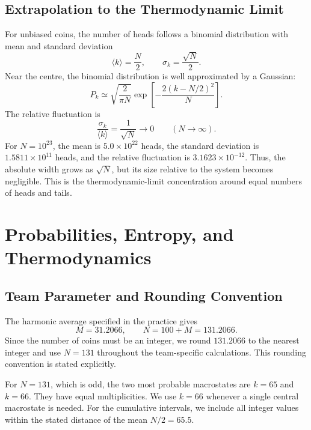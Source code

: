 \documentclass[10pt,a4paper]{article}
\begin{document}
\subsection{Extrapolation to the Thermodynamic Limit}
For unbiased coins, the number of heads follows a binomial distribution with mean and standard deviation
\begin{equation}
  \langle k\rangle=\frac{N}{2},\qquad
  \sigma_k=\frac{\sqrt{N}}{2}.
  \label{eq:mean-std}
\end{equation}
Near the centre, the binomial distribution is well approximated by a Gaussian:
\begin{equation}
  P_k\simeq\sqrt{\frac{2}{\pi N}}
  \exp\!\left[-\frac{2(k-N/2)^2}{N}\right].
  \label{eq:gaussian}
\end{equation}
The relative fluctuation is
\begin{equation}
  \frac{\sigma_k}{\langle k\rangle}=\frac{1}{\sqrt{N}}
  \longrightarrow 0 \qquad (N\to\infty).
  \label{eq:relative-fluctuation}
\end{equation}
For $N=10^{23}$, the mean is $5.0\times10^{22}$ heads, the standard deviation is $1.5811\times10^{11}$ heads, and the relative fluctuation is $3.1623\times10^{-12}$. Thus, the absolute width grows as $\sqrt{N}$, but its size relative to the system becomes negligible. This is the thermodynamic-limit concentration around equal numbers of heads and tails.

\section{Probabilities, Entropy, and Thermodynamics}

\subsection{Team Parameter and Rounding Convention}
The harmonic average specified in the practice gives
\begin{equation}
  M=31.2066,\qquad N=100+M=131.2066.
\end{equation}
Since the number of coins must be an integer, we round $131.2066$ to the nearest integer and use $\boxed{N=131}$ throughout the team-specific calculations. This rounding convention is stated explicitly.

For $N=131$, which is odd, the two most probable macrostates are $k=65$ and $k=66$. They have equal multiplicities. We use $k=66$ whenever a single central macrostate is needed. For the cumulative intervals, we include all integer values within the stated distance of the mean $N/2=65.5$.
\end{document}
